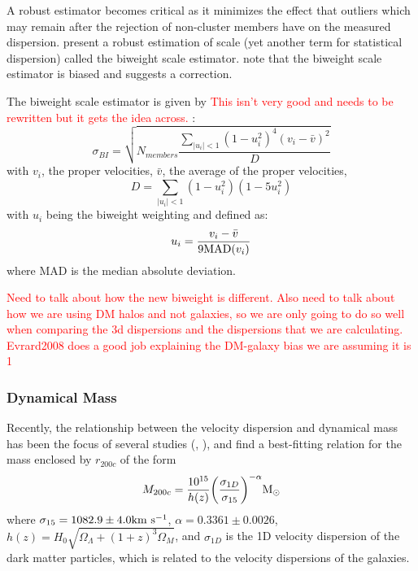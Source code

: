 \documentclass[apj, revtex4]{emulateapj}
\newcommand{\editorial}[1]{\textcolor{red}{#1} }
\begin{document}
A robust estimator becomes critical as it minimizes the effect that outliers which may remain after the rejection of non-cluster members have on the measured dispersion. \cite{Beers1990} present a robust estimation of scale (yet another term for statistical dispersion) called the biweight scale estimator. \cite{Ruel2014} note that the biweight scale estimator is biased and suggests a correction. 

The biweight scale estimator is given by \editorial{This isn't very good and needs to be rewritten but it gets the idea across.}:
\begin{equation}
	\sigma_{BI} = \sqrt{ N_{members} \frac{ \sum_{|u_i|<1} (1-u_i^2)^4 (v_i - \bar{v})^2} {D} }
\end{equation}
with $v_i$, the proper velocities, $\bar{v}$, the average of the proper velocities,
\begin{equation}
	D = \sum_{|u_i|<1} (1-u_i^2)(1-5u_i^2)
\end{equation}
with $u_i$ being the biweight weighting and defined as:
\begin{equation}
	u_i = \frac{v_i - \bar{v}}{9 {\rm MAD}(v_i)}
\end{equation}
where MAD is the median absolute deviation.

\editorial{Need to talk about how the new biweight is different. Also need to talk about how we are using DM halos and not galaxies, so we are only going to do so well when comparing the 3d dispersions and the dispersions that we are calculating. Evrard2008 does a good job explaining the DM-galaxy bias we are assuming it is 1}

\subsubsection{Dynamical Mass}
Recently, the relationship between the velocity dispersion and dynamical mass has been the focus of several studies (\eg, \citealt{Evrard2008, Saro2013, Sifon2013, VanderBurg2014}), and find a best-fitting relation for the mass enclosed by $r_{200c}$ of the form
\begin{equation}
	M_{200c} = \frac{10^{15}}{h(z)} \bigg{(}\frac{\sigma_{1D}}{\sigma_{15}} \bigg{)}^{-\alpha} \hbox{$\mathrm{M}_\odot$}
\end{equation}
where $\sigma_{15} = 1082.9 \pm 4.0 \hbox{km~s$^{-1}$}$, $\alpha = 0.3361 \pm 0.0026$, $h(z) = H_0 \sqrt{\Omega_\Lambda + (1+z)^3\Omega_M}$, and $\sigma_{1D}$ is the 1D velocity dispersion of the dark matter particles, which is related to the velocity dispersions of the galaxies. 
\end{document}
